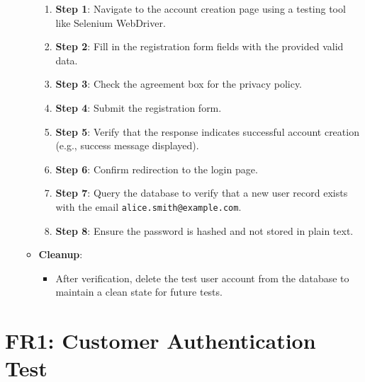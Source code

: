 \documentclass[12pt, titlepage]{article}
\begin{document}
\begin{enumerate}
\begin{itemize}
        \begin{enumerate}
            \item \textbf{Step 1}: Navigate to the account creation page using a testing tool like Selenium WebDriver.
            \item \textbf{Step 2}: Fill in the registration form fields with the provided valid data.
            \item \textbf{Step 3}: Check the agreement box for the privacy policy.
            \item \textbf{Step 4}: Submit the registration form.
            \item \textbf{Step 5}: Verify that the response indicates successful account creation (e.g., success message displayed).
            \item \textbf{Step 6}: Confirm redirection to the login page.
            \item \textbf{Step 7}: Query the database to verify that a new user record exists with the email \texttt{alice.smith@example.com}.
            \item \textbf{Step 8}: Ensure the password is hashed and not stored in plain text.
        \end{enumerate}
        \item \textbf{Cleanup}:
        \begin{itemize}
            \item After verification, delete the test user account from the database to maintain a clean state for future tests.
        \end{itemize}
    \end{itemize}
\end{enumerate}
\section*{FR1: Customer Authentication Test}
\end{document}

